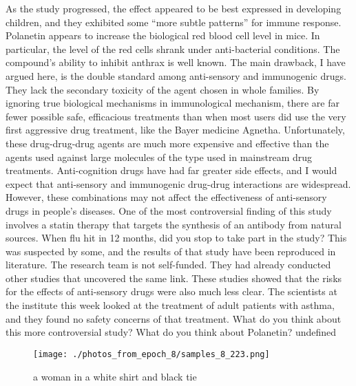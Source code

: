 \documentclass{article}%
\begin{document}
As the study progressed, the effect appeared to be best expressed in developing children, and they exhibited some “more subtle patterns” for immune response. Polanetin appears to increase the biological red blood cell level in mice. In particular, the level of the red cells shrank under anti{-}bacterial conditions. The compound’s ability to inhibit anthrax is well known.\newline%
The main drawback, I have argued here, is the double standard among anti{-}sensory and immunogenic drugs. They lack the secondary toxicity of the agent chosen in whole families. By ignoring true biological mechanisms in immunological mechanism, there are far fewer possible safe, efficacious treatments than when most users did use the very first aggressive drug treatment, like the Bayer medicine Agnetha. Unfortunately, these drug{-}drug{-}drug agents are much more expensive and effective than the agents used against large molecules of the type used in mainstream drug treatments. Anti{-}cognition drugs have had far greater side effects, and I would expect that anti{-}sensory and immunogenic drug{-}drug interactions are widespread. However, these combinations may not affect the effectiveness of anti{-}sensory drugs in people’s diseases.\newline%
One of the most controversial finding of this study involves a statin therapy that targets the synthesis of an antibody from natural sources. When flu hit in 12 months, did you stop to take part in the study? This was suspected by some, and the results of that study have been reproduced in literature.\newline%
The research team is not self{-}funded. They had already conducted other studies that uncovered the same link. These studies showed that the risks for the effects of anti{-}sensory drugs were also much less clear. The scientists at the institute this week looked at the treatment of adult patients with asthma, and they found no safety concerns of that treatment.\newline%
What do you think about this more controversial study? What do you think about Polanetin?\newline%
undefined\newline%

%


\begin{figure}[h!]%
\centering%
\texttt{[image: ./photos\_from\_epoch\_8/samples\_8\_223.png]}%
\caption{a woman in a white shirt and black tie}%
\end{figure}

%
\end{document}

